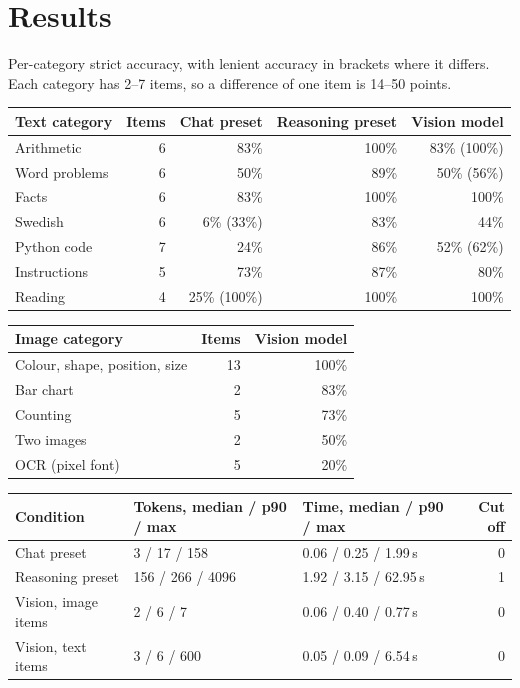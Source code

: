 \documentclass[11pt,a4paper]{article}
\begin{document}
\section{Results}\label{sec:results}

Per-category strict accuracy, with lenient accuracy in brackets where it differs. Each
category has 2--7 items, so a difference of one item is 14--50 points.

\begin{table}[H]
\centering\small
\begin{tabularx}{\textwidth}{@{}YrRRR@{}}
\toprule
Text category & Items & Chat preset & Reasoning preset & Vision model \\
\midrule
Arithmetic & 6 & 83\% & 100\% & 83\% (100\%) \\
Word problems & 6 & 50\% & 89\% & 50\% (56\%) \\
Facts & 6 & 83\% & 100\% & 100\% \\
Swedish & 6 & 6\% (33\%) & 83\% & 44\% \\
Python code & 7 & 24\% & 86\% & 52\% (62\%) \\
Instructions & 5 & 73\% & 87\% & 80\% \\
Reading & 4 & 25\% (100\%) & 100\% & 100\% \\
\bottomrule
\end{tabularx}
\end{table}

\begin{table}[H]
\centering\small
\begin{tabular}{@{}lrr@{}}
\toprule
Image category & Items & Vision model \\
\midrule
Colour, shape, position, size & 13 & 100\% \\
Bar chart & 2 & 83\% \\
Counting & 5 & 73\% \\
Two images & 2 & 50\% \\
OCR (pixel font) & 5 & 20\% \\
\bottomrule
\end{tabular}
\end{table}

\begin{table}[H]
\centering\small
\begin{tabularx}{\textwidth}{@{}YllR@{}}
\toprule
Condition & Tokens, median / p90 / max & Time, median / p90 / max & Cut off \\
\midrule
Chat preset & 3 / 17 / 158 & 0.06 / 0.25 / 1.99\,s & 0 \\
Reasoning preset & 156 / 266 / 4096 & 1.92 / 3.15 / 62.95\,s & 1 \\
Vision, image items & 2 / 6 / 7 & 0.06 / 0.40 / 0.77\,s & 0 \\
Vision, text items & 3 / 6 / 600 & 0.05 / 0.09 / 6.54\,s & 0 \\
\bottomrule
\end{tabularx}
\end{table}
\end{document}
